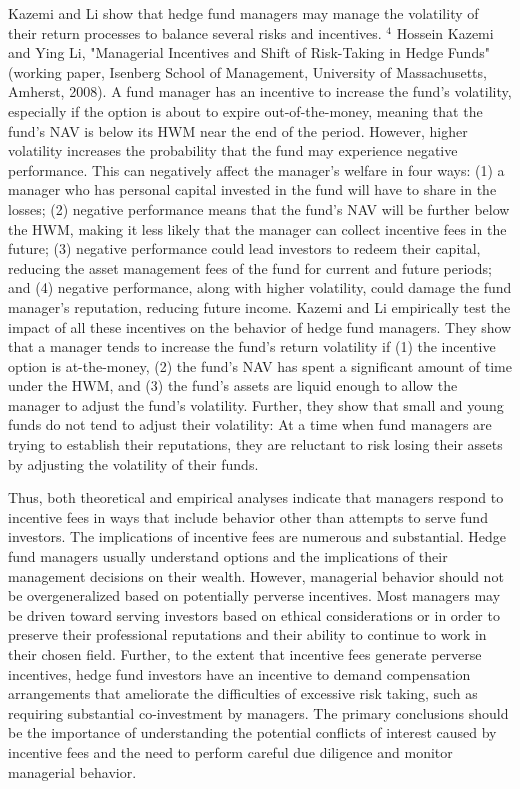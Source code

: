 \documentclass[11pt]{article}
\begin{document}
Kazemi and Li show that hedge fund managers may manage the volatility of their return processes to balance several risks and incentives. ${ }^{4}$ Hossein Kazemi and Ying Li, "Managerial Incentives and Shift of Risk-Taking in Hedge Funds" (working paper, Isenberg School of Management, University of Massachusetts, Amherst, 2008). A fund manager has an incentive to increase the fund's volatility, especially if the option is about to expire out-of-the-money, meaning that the fund's NAV is below its HWM near the end of the period. However, higher volatility increases the probability that the fund may experience negative performance. This can negatively affect the manager's welfare in four ways: (1) a manager who has personal capital invested in the fund will have to share in the losses; (2) negative performance means that the fund's NAV will be further below the HWM, making it less likely that the manager can collect incentive fees in the future; (3) negative performance could lead investors to redeem their capital, reducing the asset management fees of the fund for current and future periods; and (4) negative performance, along with higher volatility, could damage the fund manager's reputation, reducing future income. Kazemi and Li empirically test the impact of all these incentives on the behavior of hedge fund managers. They show that a manager tends to increase the fund's return volatility if (1) the incentive option is at-the-money, (2) the fund's NAV has spent a significant amount of time under the HWM, and (3) the fund's assets are liquid enough to allow the manager to adjust the fund's volatility. Further, they show that small and young funds do not tend to adjust their volatility: At a time when fund managers are trying to establish their reputations, they are reluctant to risk losing their assets by adjusting the volatility of their funds.

Thus, both theoretical and empirical analyses indicate that managers respond to incentive fees in ways that include behavior other than attempts to serve fund investors. The implications of incentive fees are numerous and substantial. Hedge fund managers usually understand options and the implications of their management decisions on their wealth. However, managerial behavior should not be overgeneralized based on potentially perverse incentives. Most managers may be driven toward serving investors based on ethical considerations or in order to preserve their professional reputations and their ability to continue to work in their chosen field. Further, to the extent that incentive fees generate perverse incentives, hedge fund investors have an incentive to demand compensation arrangements that ameliorate the difficulties of excessive risk taking, such as requiring substantial co-investment by managers. The primary conclusions should be the importance of understanding the potential conflicts of interest caused by incentive fees and the need to perform careful due diligence and monitor managerial behavior.
\end{document}
